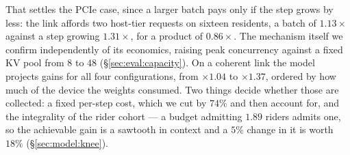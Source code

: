 That settles the PCIe case, since a larger batch pays only if the step grows by
less: the link affords two host-tier requests on sixteen residents, a batch of
$1.13\times$ against a step growing $1.31\times$, for a product of $0.86\times$.
The mechanism itself we confirm independently of its economics, raising peak
concurrency against a fixed KV pool from 8 to 48 (\S\ref{sec:eval:capacity}).
On a coherent link the model projects gains for all four configurations, from
$\times 1.04$ to $\times 1.37$, ordered by how much of the device the weights
consumed. Two things decide whether those are collected: a fixed per-step cost,
which we cut by $74\%$ and then account for, and the integrality of the rider
cohort --- a budget admitting $1.89$ riders admits one, so the achievable gain is a
sawtooth in context and a $5\%$ change in it is worth $18\%$
(\S\ref{sec:model:knee}).

